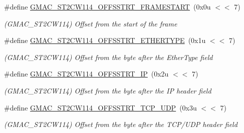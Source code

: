 \begin{DoxyCompactItemize}
\item 
\mbox{\label{group__SAME70__GMAC_ga35e12eda749231508088c9485ef48ddf}} 
\#define \mbox{\hyperlink{group__SAME70__GMAC_ga35e12eda749231508088c9485ef48ddf}{G\+M\+A\+C\+\_\+\+S\+T2\+C\+W114\+\_\+\+O\+F\+F\+S\+S\+T\+R\+T\+\_\+\+F\+R\+A\+M\+E\+S\+T\+A\+RT}}~(0x0u $<$$<$ 7)
\begin{DoxyCompactList}\small\item\em (G\+M\+A\+C\+\_\+\+S\+T2\+C\+W114) Offset from the start of the frame \end{DoxyCompactList}\item 
\mbox{\label{group__SAME70__GMAC_gaef25eb112e5bb00d304f3f0ae7b18279}} 
\#define \mbox{\hyperlink{group__SAME70__GMAC_gaef25eb112e5bb00d304f3f0ae7b18279}{G\+M\+A\+C\+\_\+\+S\+T2\+C\+W114\+\_\+\+O\+F\+F\+S\+S\+T\+R\+T\+\_\+\+E\+T\+H\+E\+R\+T\+Y\+PE}}~(0x1u $<$$<$ 7)
\begin{DoxyCompactList}\small\item\em (G\+M\+A\+C\+\_\+\+S\+T2\+C\+W114) Offset from the byte after the Ether\+Type field \end{DoxyCompactList}\item 
\mbox{\label{group__SAME70__GMAC_gad540cdb4585551b8be51a9668bb5f842}} 
\#define \mbox{\hyperlink{group__SAME70__GMAC_gad540cdb4585551b8be51a9668bb5f842}{G\+M\+A\+C\+\_\+\+S\+T2\+C\+W114\+\_\+\+O\+F\+F\+S\+S\+T\+R\+T\+\_\+\+IP}}~(0x2u $<$$<$ 7)
\begin{DoxyCompactList}\small\item\em (G\+M\+A\+C\+\_\+\+S\+T2\+C\+W114) Offset from the byte after the IP header field \end{DoxyCompactList}\item 
\mbox{\label{group__SAME70__GMAC_gab95eee5e576df2b6245e3ee82497cd81}} 
\#define \mbox{\hyperlink{group__SAME70__GMAC_gab95eee5e576df2b6245e3ee82497cd81}{G\+M\+A\+C\+\_\+\+S\+T2\+C\+W114\+\_\+\+O\+F\+F\+S\+S\+T\+R\+T\+\_\+\+T\+C\+P\+\_\+\+U\+DP}}~(0x3u $<$$<$ 7)
\begin{DoxyCompactList}\small\item\em (G\+M\+A\+C\+\_\+\+S\+T2\+C\+W114) Offset from the byte after the T\+C\+P/\+U\+DP header field \end{DoxyCompactList}\item 
\mbox{\label{group__SAME70__GMAC_ga4c7d1c7dd47556ff170eb753648b3001}} 

\end{DoxyCompactItemize}

